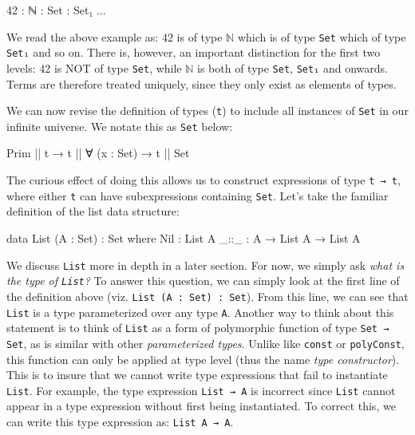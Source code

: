 \documentclass[12pt]{article}
\begin{document}
\begin{center}
\begin{minipage}{0.4\textwidth}
\begin{code}
42 : ℕ : Set : Set₁ ...
\end{code}
\end{minipage}
\end{center}

We read the above example as: 42 is of type \(\mathbb{N}\) which is of type
{\tt Set} which of type {\tt Set₁} and so on. There is, however, an important
distinction for the first two levels: 42 is NOT of type {\tt Set}, while
\(\mathbb{N}\) is both of type {\tt Set}, {\tt Set₁} and onwards. Terms are
therefore treated uniquely, since they only exist as elements of types.

We can now revise the definition of types ({\tt t}) to include all instances of
{\tt Set} in our infinite universe. We notate this as {\tt Set} below:

\begin{center}
\begin{minipage}{0.65\textwidth}
\begin{code}
Prim || t → t || ∀ (x : Set) → t || Set
\end{code}
\end{minipage}
\end{center}
The curious effect of doing this allows us to construct expressions of type
{\tt t → t}, where either {\tt t} can have subexpressions containing {\tt Set}.
Let's take the familiar definition of the list data structure:

\begin{center}
\begin{minipage}{0.65\textwidth}
\begin{code}
data List (A : Set) : Set where
  Nil  : List A
  _::_ : A → List A → List A
\end{code}
\end{minipage}
\end{center}

We discuss {\tt List} more in depth in a later section. For now, we simply ask
{\em what is the type of {\tt List}?} To answer this question, we can simply
look at the first line of the definition above (viz. {\tt List (A : Set) : Set}).
From this line, we can see that {\tt List} is a type parameterized over any type
{\tt A}. Another way to think about this statement is to think of {\tt List} as
a form of polymorphic function of type {\tt Set → Set}, as is similar with other
{\em parameterized types}. Unlike like {\tt const} or {\tt polyConst}, this
function can only be applied at type level (thus the name {\em type constructor}).
This is to insure that we cannot write type expressions that fail to instantiate
{\tt List}. For example, the type expression {\tt List → A} is incorrect since
{\tt List} cannot appear in a type expression without first being instantiated.
To correct this, we can write this type expression as: {\tt List A → A}.
\end{document}
